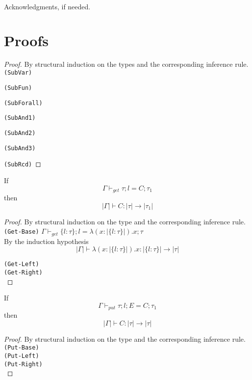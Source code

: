 \documentclass[preprint]{sigplanconf}
\begin{document}

Acknowledgments, if needed.

\appendix

\section{Proofs}

\begin{proof}
By structural induction on the types and the corresponding inference rule. \\

\texttt{(SubVar)}

\texttt{(SubFun)}

\texttt{(SubForall)}

\texttt{(SubAnd1)}

\texttt{(SubAnd2)}

\texttt{(SubAnd3)}

\texttt{(SubRcd)}

\end{proof}

\begin{lemma} \label{type-get}
  If $$ \Gamma \vdash_{get} \tau ; l = C ; \tau_1 $$
  then $$ |\Gamma| \vdash C : |\tau| \to |\tau_1| $$
\end{lemma}

\begin{proof}
By structural induction on the type and the corresponding inference rule. \\

\texttt{(Get-Base)} $ \Gamma \vdash_{get} \{ l : \tau \} ; l = \lambda (x : |\{ l : \tau \}|). x ; \tau $ \\

By the induction hypothesis
$$ |\Gamma| \vdash \lambda (x : |\{ l : \tau \}|). x : |\{ l : \tau \}| \to |\tau| $$

\texttt{(Get-Left)} \\
\texttt{(Get-Right)} \\

\end{proof}

\begin{lemma} \label{type-put}
  If $$ \Gamma \vdash_{put} \tau ; l ; E = C ; \tau_1 $$
  then $$ |\Gamma| \vdash C : |\tau| \to |\tau| $$
\end{lemma}

\begin{proof}
By structural induction on the type and the corresponding inference rule. \\

\texttt{(Put-Base)} \\
\texttt{(Put-Left)} \\
\texttt{(Put-Right)} \\
\end{proof}
\end{document}
